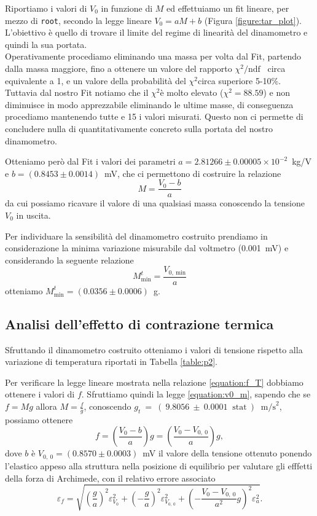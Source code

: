 \documentclass[italian, a4paper, 10pt, twocolumn]{../../style/lab_unige}
\newcommand{\reftab}[1]{Tabella {\ref{#1}}}%
\newcommand{\reffig}[1]{Figura {\ref{#1}}}%
\newcommand{\ChiSqr}{$\chi^2$\space}
\newcommand{\ChiNdf}{$\chi^2/\text{ndf}$}
\newcommand{\cernroot}{\texttt{root}}
\newcommand{\mstdErr}[1]{\varepsilon_{#1}}
\newcommand{\gLab}{$g_t~=~(~9.8056~\pm~0.0001~\text{ stat}~)~\text{ m/s}^2$}
\begin{document}
    Riportiamo i valori di $V_0$ in funzione di $M$ ed effettuiamo un fit lineare, per mezzo di \cernroot, secondo la legge lineare $V_0=aM+b$ (\reffig{figure:tar_plot}).\\
    L’obiettivo è quello di trovare il limite del regime di linearità del dinamometro e quindi la sua portata.\\
    Operativamente procediamo eliminando una massa per volta dal Fit, partendo dalla massa maggiore, fino a ottenere un valore del rapporto \ChiNdf~ circa equivalente a 1, e un valore della probabilità del \ChiSqr circa superiore 5-10\%.\\
    Tuttavia dal nostro Fit notiamo che il \ChiSqr è molto elevato (\ChiSqr$=88.59$) e non diminuisce in modo apprezzabile eliminando le ultime masse, di conseguenza procediamo mantenendo tutte e 15 i valori misurati. Questo non ci permette di concludere nulla di quantitativamente concreto sulla portata del nostro dinamometro.

    Otteniamo però dal Fit i valori dei parametri $a=2.81266\pm0.00005\times10^{-2}$~kg/V e $b=(0.8453\pm0.0014)$~mV, che ci permettono di costruire la relazione 
    \[
        M = \frac{V_0-b}{a}  
    \]
    da cui possiamo ricavare il valore di una qualsiasi massa conoscendo la tensione $V_0$ in uscita.

    Per individuare la sensibilità del dinamometro costruito prendiamo in considerazione la minima variazione misurabile dal voltmetro (0.001~mV) e considerando la seguente relazione \[M_{\text{min}}^t = \frac{V_{0,~\text{min}}}{a}\] otteniamo $M_{\text{min}}^t=(0.0356\pm0.0006)$~g.

    \subsection{Analisi dell'effetto di contrazione termica}
    
    

    Sfruttando il dinamometro costruito otteniamo i valori di tensione rispetto alla variazione di temperatura riportati in \reftab{table:p2}.

    Per verificare la legge lineare mostrata nella relazione \ref{equation:f_T} dobbiamo ottenere i valori di $f$. Sfruttiamo quindi la legge \ref{equation:v0_m}, sapendo che se $f=Mg$ allora $M=\frac{f}{g}$, conoscendo \gLab, possiamo ottenere \[f=\left(\frac{V_0-b}{a}\right)g=\left(\frac{V_0-V_{0,~0}}{a}\right)g,\] dove $b$ è $V_{0,~0}=(0.8570\pm0.0003)$~mV il valore della tensione ottenuto ponendo l'elastico appeso alla struttura nella posizione di equilibrio per valutare gli efffetti della forza di Archimede, con il relativo errore associato \[\mstdErr{f}=\sqrt{\left(\frac{g}{a}\right)^2\mstdErr{V_0}^2+\left(-\frac{g}{a}\right)^2\mstdErr{V_{0,~0}}^2+\left(-\frac{V_0-V_{0,~0}}{a^2}g\right)^2\mstdErr{a}^2}.\]
\end{document}
